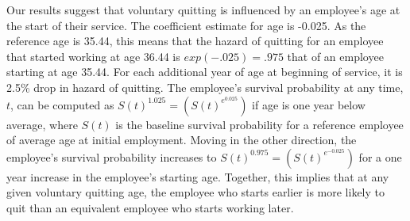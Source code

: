 Our results suggest that voluntary quitting is influenced by an employee's age at the start of their service. The coefficient estimate for age is -0.025. As the reference age is 35.44, this means that the hazard of quitting for an employee that started working at age 36.44 is $exp(-.025)=.975$ that of an employee starting at age 35.44. For each additional year of age at beginning of service, it is 2.5\% drop in hazard of quitting. The employee's survival probability at any time, $t$, can be computed as $S(t)^{1.025} = (S(t)^{e^{0.025}})$ if age is one year below average, where $S(t)$ is the baseline survival probability for a reference employee of average age at initial employment. Moving in the other direction, the employee's survival probability increases to $S(t)^{0.975}=(S(t)^{e^{-0.025}})$ for a one year increase in the employee's starting age. Together, this implies that at any given voluntary quitting age, the employee who starts earlier is more likely to quit than an equivalent employee who starts working later.

